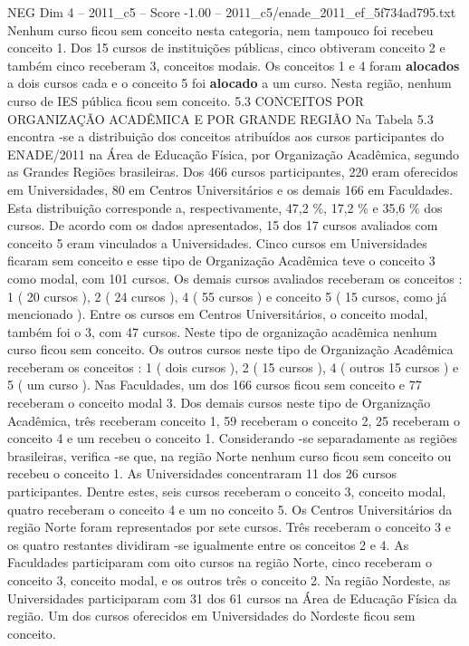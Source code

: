 \begin{textsample}{NEG Dim 4 – 2011\_c5 – Score -1.00 – 2011\_c5/enade\_2011\_ef\_5f734ad795.txt}
Nenhum curso ficou sem conceito nesta categoria, nem tampouco foi recebeu conceito 1.
Dos 15 cursos de instituições públicas, cinco obtiveram conceito 2 e também cinco receberam 3, conceitos modais.
Os conceitos 1 e 4 foram \textbf{alocados} a dois cursos cada e o conceito 5 foi \textbf{alocado} a um curso.
Nesta região, nenhum curso de IES pública ficou sem conceito. 5.3 CONCEITOS POR ORGANIZAÇÃO ACADÊMICA E POR GRANDE REGIÃO Na Tabela 5.3 encontra -se a distribuição dos conceitos atribuídos aos cursos participantes do ENADE/2011 na Área de Educação Física, por Organização Acadêmica, segundo as Grandes Regiões brasileiras.
Dos 466 cursos participantes, 220 eram oferecidos em Universidades, 80 em Centros Universitários e os demais 166 em Faculdades.
Esta distribuição corresponde a, respectivamente, 47,2 \%, 17,2 \% e 35,6 \% dos cursos.
De acordo com os dados apresentados, 15 dos 17 cursos avaliados com conceito 5 eram vinculados a Universidades.
Cinco cursos em Universidades ficaram sem conceito e esse tipo de Organização Acadêmica teve o conceito 3 como modal, com 101 cursos.
Os demais cursos avaliados receberam os conceitos : 1 ( 20 cursos ), 2 ( 24 cursos ), 4 ( 55 cursos ) e conceito 5 ( 15 cursos, como já mencionado ).
Entre os cursos em Centros Universitários, o conceito modal, também foi o 3, com 47 cursos.
Neste tipo de organização acadêmica nenhum curso ficou sem conceito.
Os outros cursos neste tipo de Organização Acadêmica receberam os conceitos : 1 ( dois cursos ), 2 ( 15 cursos ), 4 ( outros 15 cursos ) e 5 ( um curso ).
Nas Faculdades, um dos 166 cursos ficou sem conceito e 77 receberam o conceito modal 3.
Dos demais cursos neste tipo de Organização Acadêmica, três receberam conceito 1, 59 receberam o conceito 2, 25 receberam o conceito 4 e um recebeu o conceito 1.
Considerando -se separadamente as regiões brasileiras, verifica -se que, na região Norte nenhum curso ficou sem conceito ou recebeu o conceito 1.
As Universidades concentraram 11 dos 26 cursos participantes.
Dentre estes, seis cursos receberam o conceito 3, conceito modal, quatro receberam o conceito 4 e um no conceito 5.
Os Centros Universitários da região Norte foram representados por sete cursos.
Três receberam o conceito 3 e os quatro restantes dividiram -se igualmente entre os conceitos 2 e 4.
As Faculdades participaram com oito cursos na região Norte, cinco receberam o conceito 3, conceito modal, e os outros três o conceito 2.
Na região Nordeste, as Universidades participaram com 31 dos 61 cursos na Área de Educação Física da região.
Um dos cursos oferecidos em Universidades do Nordeste ficou sem conceito.

\end{textsample}
